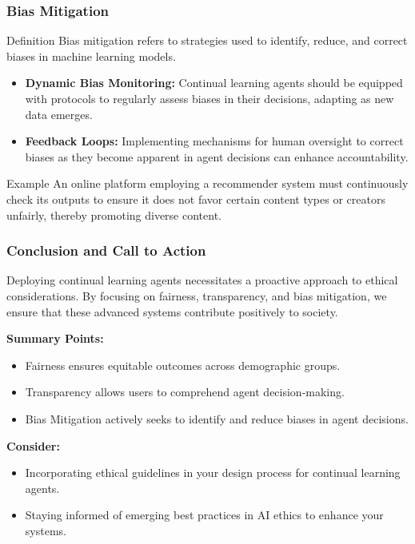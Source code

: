 \documentclass[aspectratio=169]{beamer}
\begin{document}
\begin{frame}[fragile]
    \frametitle{Bias Mitigation}
    \begin{block}{Definition}
        Bias mitigation refers to strategies used to identify, reduce, and correct biases in machine learning models.
    \end{block}
    \begin{itemize}
        \item \textbf{Dynamic Bias Monitoring:} Continual learning agents should be equipped with protocols to regularly assess biases in their decisions, adapting as new data emerges.
        \item \textbf{Feedback Loops:} Implementing mechanisms for human oversight to correct biases as they become apparent in agent decisions can enhance accountability.
    \end{itemize}
    \begin{block}{Example}
        An online platform employing a recommender system must continuously check its outputs to ensure it does not favor certain content types or creators unfairly, thereby promoting diverse content.
    \end{block}
\end{frame}

\begin{frame}[fragile]
    \frametitle{Conclusion and Call to Action}
    Deploying continual learning agents necessitates a proactive approach to ethical considerations. By focusing on fairness, transparency, and bias mitigation, we ensure that these advanced systems contribute positively to society.
    
    \textbf{Summary Points:}
    \begin{itemize}
        \item Fairness ensures equitable outcomes across demographic groups.
        \item Transparency allows users to comprehend agent decision-making.
        \item Bias Mitigation actively seeks to identify and reduce biases in agent decisions.
    \end{itemize}
    
    \textbf{Consider:}
    \begin{itemize}
        \item Incorporating ethical guidelines in your design process for continual learning agents.
        \item Staying informed of emerging best practices in AI ethics to enhance your systems.
    \end{itemize}
\end{frame}
\end{document}
